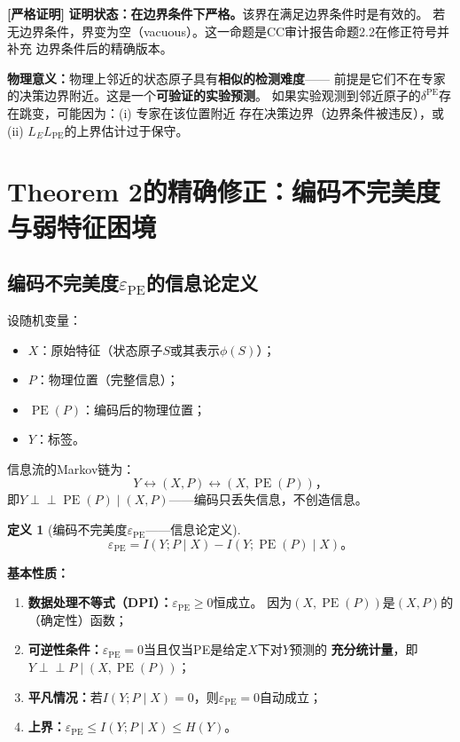 \documentclass[11pt,a4paper]{article}
\newtheorem{definition}[theorem]{定义}
\theoremstyle{remark}
\DeclareMathOperator{\PE}{PE}
\newcommand{\indep}{\perp\!\!\!\perp}
\newcommand{\rigorous}{\textnormal{\textbf{[严格证明]}}}
\begin{document}
\rigorous{} \textbf{证明状态：在边界条件下严格。}该界在满足边界条件时是有效的。
若无边界条件，界变为空（vacuous）。这一命题是CC审计报告命题2.2在修正符号并补充
边界条件后的精确版本。

\textbf{物理意义：}物理上邻近的状态原子具有\textbf{相似的检测难度}——
前提是它们不在专家的决策边界附近。这是一个\textbf{可验证的实验预测}。
如果实验观测到邻近原子的$\delta^{\PE}$存在跳变，可能因为：(i) 专家在该位置附近
存在决策边界（边界条件被违反），或 (ii) $L_E L_{\PE}$的上界估计过于保守。

\section{Theorem 2的精确修正：编码不完美度与弱特征困境}

\subsection{编码不完美度$\varepsilon_{\PE}$的信息论定义}

设随机变量：
\begin{itemize}
    \item $X$：原始特征（状态原子$S$或其表示$\phi(S)$）；
    \item $P$：物理位置（完整信息）；
    \item $\PE(P)$：编码后的物理位置；
    \item $Y$：标签。
\end{itemize}
信息流的Markov链为：
\begin{equation}
    Y \leftrightarrow (X, P) \leftrightarrow (X, \PE(P))，
\end{equation}
即$Y \indep \PE(P) \mid (X, P)$——编码只丢失信息，不创造信息。

\begin{definition}[编码不完美度$\varepsilon_{\PE}$——信息论定义]
\label{def:3.1}
\begin{equation}
    \boxed{
    \varepsilon_{\PE} = I(Y; P \mid X) - I(Y; \PE(P) \mid X)
    }。
\end{equation}
\end{definition}

\textbf{基本性质：}
\begin{enumerate}[label=(\arabic*)]
    \item \textbf{数据处理不等式（DPI）：}$\varepsilon_{\PE} \geq 0$恒成立。
          因为$(X, \PE(P))$是$(X, P)$的（确定性）函数；
    \item \textbf{可逆性条件：}$\varepsilon_{\PE} = 0$当且仅当PE是给定$X$下对$Y$预测的
          \textbf{充分统计量}，即$Y \indep P \mid (X, \PE(P))$；
    \item \textbf{平凡情况：}若$I(Y; P \mid X) = 0$，则$\varepsilon_{\PE} = 0$自动成立；
    \item \textbf{上界：}$\varepsilon_{\PE} \leq I(Y; P \mid X) \leq H(Y)$。
\end{enumerate}
\end{document}
